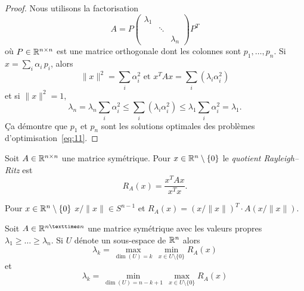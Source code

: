 \begin{proof}
  Nous utilisons la factorisation 
  \begin{displaymath}
    A = P
    \begin{pmatrix}
      \lambda_1 \\
      & \ddots \\
      && \lambda_n
    \end{pmatrix} P^T
  \end{displaymath}
où $P \in \mathbb{R}^{n\times n}$ est une matrice orthogonale dont les colonnes sont $p_1,\dots,p_n$. Si $x = \sum_i \alpha_i \,p_i$,   alors 
\begin{displaymath}
\|x\|^2 = \sum_i \alpha_i^2   \text{ et } x^T A x =  \sum_i (\lambda_i \alpha_i^2)
\end{displaymath}
et si $\|x\|^2 = 1$, 
\begin{displaymath}
\lambda_n =  \lambda_n  \sum_i  \alpha_i^2  \leq  \sum_i (\lambda_i \alpha_i^2) \leq \lambda_1  \sum_i  \alpha_i^2 = \lambda_1. 
\end{displaymath}
Ça démontre que $p_1$ et $p_n$ sont les solutions optimales des problèmes d'optimisation~\eqref{eq:11}. 

\end{proof}



\begin{definition}
  \label{def:23}
  Soit $A \in \mathbb{R}^{n \times n}$ une matrice symétrique. Pour $x \in \mathbb{R}^n\setminus \{0\}$ le  \emph{quotient Rayleigh–Ritz } est 
\begin{displaymath}
  R_A(x) = \frac{x^TAx}{x^Tx}. 
\end{displaymath}
\end{definition}
Pour $x \in \mathbb{R}^n \setminus \{0\}$ $ x / \|x\| \in S^{n-1}$ et $R_A(x) = (x / \|x\| )^T \cdot A  (x / \|x\|)$. 

\begin{theorem}
\label{thr:19}
Soit $A \in \R^{n × n}$ une matrice symétrique avec les valeurs propres 
$\lambda_1 \geq \dots \geq \lambda_n$.   Si $U$ dénote un sous-espace de $\mathbb{R}^n$ alors 
\begin{equation}
  \label{eq:12} 
  \lambda_k = \max_{ \dim(U) = k } \, \min_{x \in U \setminus \{0\}}  R_A(x)  
\end{equation}
et
\begin{equation}
  \label{eq:13}
  \lambda_k = \min_{ \dim(U) = n-k+1 } \, \max_{x \in U \setminus \{0\}}  R_A(x)  
\end{equation}
\end{theorem}

